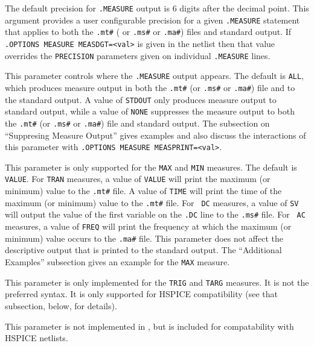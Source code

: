 \begin{Command}
\begin{Arguments}

The default precision for {\tt .MEASURE} output is 6 digits after the
decimal point.  This argument provides a user configurable precision
for a given {\tt .MEASURE} statement that applies to both
the \texttt{.mt\#} ( or \texttt{.ms\#} or \texttt{.ma\#}) files and
standard output.  If \texttt{.OPTIONS MEASURE MEASDGT=<val>} is given
in the netlist then that value overrides the \texttt{PRECISION}
parameters given on individual \texttt{.MEASURE} lines.


This parameter controls where the {\tt .MEASURE} output appears.  The
default is {\tt ALL}, which produces measure output in both
the \texttt{.mt\#} (or \texttt{.ms\#} or
\texttt{.ma\#}) file and to the standard output.  A value of
{\tt STDOUT} only produces measure output to standard output, while a
value of {\tt NONE} suppresses the measure output to both
the \texttt{.mt\#} (or \texttt{.ms\#} or \texttt{.ma\#}) file and
standard output.  The subsection on ``Suppresing Measure Output''
gives examples and also discuss the interactions of this parameter
with \texttt{.OPTIONS MEASURE MEASPRINT=<val>}.


This parameter is only supported for the {\tt MAX} and {\tt MIN}
measures.  The default is {\tt VALUE}.  For {\tt TRAN} measures, a
value of {\tt VALUE} will print the maximum (or minimum) value to
the \texttt {.mt\#} file.  A value of {\tt TIME} will print the time
of the maximum (or minimum) value to the \texttt{.mt\#} file. For {\tt
DC} measures, a value of {\tt SV} will output the value of the first
variable on the {\tt .DC} line to the \texttt{.ms\#} file.  For {\tt
AC} measures, a value of {\tt FREQ} will print the frequency at which
the maximum (or minimum) value occurs to the \texttt{.ma\#} file.
This parameter does not affect the descriptive output that is printed
to the standard output.  The ``Additional Examples'' subsection gives
an example for the {\tt MAX} measure.

This parameter is only implemented for the {\tt TRIG} and {\tt TARG}
measures.  It is not the preferred \Xyce{} syntax. It is only
supported for HSPICE compatibility (see that subsection, below, for
details).


This parameter is not implemented in \Xyce{}, but is included for compatability
with HSPICE netlists.


\end{Arguments}
\end{Command}
